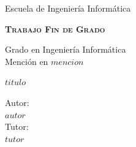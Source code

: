 \documentclass[openright,twoside,10pt]{book}
\begin{document}
{\begin{titlepage}
\begin{center}
            \vspace*{0.15in}
            \vspace*{0.6in}
            \begin{Huge}
                {Escuela de Ingeniería Informática\\}
            \end{Huge}
            \vspace*{0.2in}
            \begin{Large}
                \textbf{\textsc{Trabajo Fin de Grado\\}}
            \end{Large}
            \vspace*{0.5in}
            \begin{Large}
                { Grado en Ingeniería Informática}\\
                { Mención en $mencion$ \\}
            \end{Large}
            \vspace*{0.5in}
            \vspace*{0.3in}
            \begin{large}
                \textbf{{\LARGE $titulo$\\}}
            \end{large}
            \vspace*{0.3in}
            \vspace*{1.3in}
            \begin{large}
                \begin{flushright}
                    Autor:\\
                    \textbf{$autor$} \\
                    \vspace*{0.3in}
                    Tutor:\\
                    \textbf{$tutor$}
                \end{flushright}
            \end{large}
        \end{center}
    \end{titlepage}

    }
    
    \newpage
    \mbox{}	
    \thispagestyle{empty} %
\end{document}
